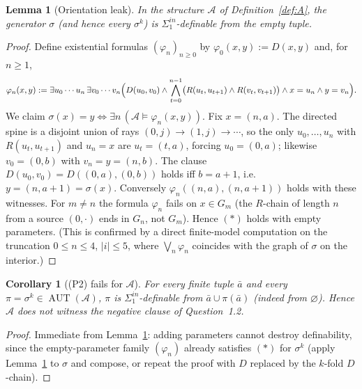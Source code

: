 \documentclass[12pt,fullpage]{article}
\newtheorem{lemma}[theorem]{Lemma}
\newtheorem{corollary}[theorem]{Corollary}
\theoremstyle{definition}
\newcommand{\A}{\mathcal{A}}
\newcommand{\AUT}{\operatorname{AUT}}
\renewcommand{\phi}{\varphi}
\begin{document}
\begin{lemma}[Orientation leak]\label{lem:leak}
In the structure $\A$ of Definition~\ref{def:A}, the generator $\sigma$ (and
hence every $\sigma^k$) is $\Sigma^{in}_1$-definable from the \emph{empty}
tuple.
\end{lemma}

\begin{proof}
Define existential formulas $(\phi_n)_{n\ge0}$ by $\phi_0(x,y):=D(x,y)$ and,
for $n\ge1$,
\[
\phi_n(x,y):=\exists u_0\cdots u_n\,\exists v_0\cdots v_n\Bigl(
D(u_0,v_0)\wedge\bigwedge_{t=0}^{n-1}\bigl(R(u_t,u_{t+1})\wedge R(v_t,v_{t+1})\bigr)
\wedge x=u_n\wedge y=v_n\Bigr).
\]
We claim $\sigma(x)=y\iff\exists n\,(\A\models\phi_n(x,y))$.  Fix $x=(n,a)$.
The directed spine is a disjoint union of rays $(0,j)\to(1,j)\to\cdots$, so the
only $u_0,\dots,u_n$ with $R(u_t,u_{t+1})$ and $u_n=x$ are
$u_t=(t,a)$, forcing $u_0=(0,a)$; likewise $v_0=(0,b)$ with $v_n=y=(n,b)$.
The clause $D(u_0,v_0)=D((0,a),(0,b))$ holds iff $b=a+1$, i.e.\ $y=(n,a+1)=
\sigma(x)$.  Conversely $\phi_n((n,a),(n,a+1))$ holds with these witnesses.
For $m\neq n$ the formula $\phi_n$ fails on $x\in G_m$ (the $R$-chain of length
$n$ from a source $(0,\cdot)$ ends in $G_n$, not $G_m$).  Hence $(\ast)$ holds
with empty parameters.  (This is confirmed by a direct finite-model
computation on the truncation $0\le n\le4$, $|i|\le5$, where
$\bigvee_n\phi_n$ coincides with the graph of $\sigma$ on the interior.)
\end{proof}

\begin{corollary}[(P2) fails for $\A$]\label{cor:P2-fails}
For every finite tuple $\bar a$ and every $\pi=\sigma^k\in\AUT(\A)$, $\pi$
\emph{is} $\Sigma^{in}_1$-definable from $\bar a\cup\pi(\bar a)$ (indeed from
$\varnothing$).  Hence $\A$ does not witness the negative clause of
Question~1.2.
\end{corollary}

\begin{proof}
Immediate from Lemma~\ref{lem:leak}: adding parameters cannot destroy
definability, since the empty-parameter family $(\phi_n)$ already satisfies
$(\ast)$ for $\sigma^k$ (apply Lemma~\ref{lem:leak} to $\sigma$ and compose, or
repeat the proof with $D$ replaced by the $k$-fold $D$-chain).
\end{proof}
\end{document}
